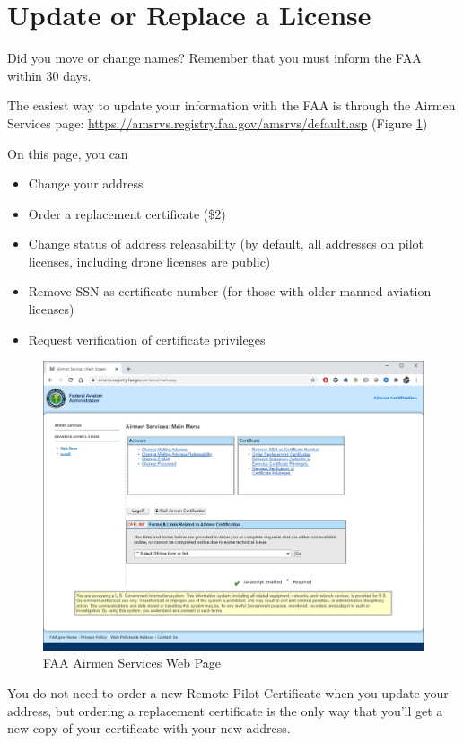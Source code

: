 \documentclass[
  12pt,
]{book}
\providecommand{\tightlist}{%
  \setlength{\itemsep}{0pt}\setlength{\parskip}{0pt}}
\begin{document}
\hypertarget{replace-license}{%
\section{Update or Replace a License}\label{replace-license}}

Did you move or change names? Remember that you must inform the FAA within 30 days.

The easiest way to update your information with the FAA is through the Airmen Services page: \url{https://amsrvs.registry.faa.gov/amsrvs/default.asp} (Figure \ref{fig:airmen-services})

On this page, you can

\begin{itemize}
\tightlist
\item
  Change your address
\item
  Order a replacement certificate (\$2)
\item
  Change status of address releasability (by default, all addresses on pilot licenses, including drone licenses are public)
\item
  Remove SSN as certificate number (for those with older manned aviation licenses)
\item
  Request verification of certificate privileges
\end{itemize}

\begin{figure}

{\centering \includegraphics[width=0.7\linewidth]{images/airmen-services} 

}

\caption{FAA Airmen Services Web Page}\label{fig:airmen-services}
\end{figure}

You do not need to order a new Remote Pilot Certificate when you update your address, but ordering a replacement certificate is the only way that you'll get a new copy of your certificate with your new address.
\end{document}
